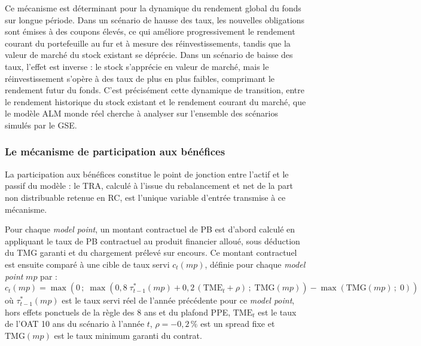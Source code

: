 Ce mécanisme est déterminant pour la dynamique du rendement global du fonds sur longue période. Dans un scénario de hausse des taux, les nouvelles obligations sont émises à des coupons élevés, ce qui améliore progressivement le rendement courant du portefeuille au fur et à mesure des réinvestissements, tandis que la valeur de marché du stock existant se déprécie. Dans un scénario de baisse des taux, l'effet est inverse : le stock s'apprécie en valeur de marché, mais le réinvestissement s'opère à des taux de plus en plus faibles, comprimant le rendement futur du fonds. C'est précisément cette dynamique de transition, entre le rendement historique du stock existant et le rendement courant du marché, que le modèle ALM monde réel cherche à analyser sur l'ensemble des scénarios simulés par le GSE.

\subsubsection{Le mécanisme de participation aux bénéfices}

La participation aux bénéfices constitue le point de jonction entre l'actif et le passif du modèle : le TRA, calculé à l'issue du rebalancement et net de la part non distribuable retenue en RC, est l'unique variable d'entrée transmise à ce mécanisme.

Pour chaque \textit{model point}, un montant contractuel de PB est d'abord calculé en appliquant le taux de PB contractuel au produit financier alloué, sous déduction du TMG garanti et du chargement prélevé sur encours. Ce montant contractuel est ensuite comparé à une cible de taux servi $c_t(mp)$, définie pour chaque \textit{model point} $mp$ par :
\begin{equation}
    c_t(mp) = \max\!\left(0\,;\; \max\!\left(0{,}8\;\tau^*_{t-1}(mp) + 0{,}2\,\left(\text{TME}_t + \rho\right)\,;\; \text{TMG}(mp)\right) - \max\!\left(\text{TMG}(mp)\,;\; 0\right)\right)
    \label{eq:taux_cible}
\end{equation}
où $\tau^*_{t-1}(mp)$ est le taux servi réel de l'année précédente pour ce \textit{model point}, hors effets ponctuels de la règle des 8 ans et du plafond PPE, $\text{TME}_t$ est le taux de l'OAT 10 ans du scénario à l'année $t$, $\rho = -0{,}2\,\%$ est un spread fixe et $\text{TMG}(mp)$ est le taux minimum garanti du contrat.

